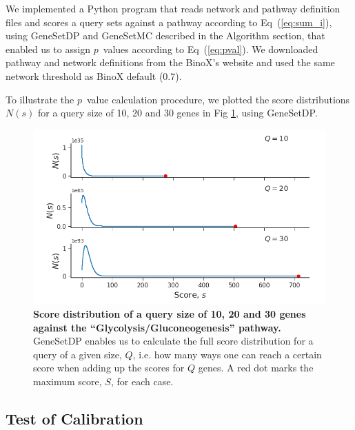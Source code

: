 \documentclass[10pt,letterpaper]{article}
\begin{document}
We implemented a Python program that reads network and pathway definition files and scores a query sets against a pathway according to Eq~(\ref{eq:sum_i}), using GeneSetDP and GeneSetMC described in the Algorithm section, that enabled us to assign $p$~values according to Eq~(\ref{eq:pval}). We downloaded pathway and network definitions from the BinoX's website and used the same network threshold as BinoX default ($0.7$).

To illustrate the $p$~value calculation procedure, we plotted the score distributions $N(s)$ for a query size of 10, 20 and 30 genes in Fig \ref{fig:score_dist}, using GeneSetDP.

\begin{figure}[htb]
	\begin{center}
		\includegraphics[width=.9\textwidth]{figures/score_distribuition_multiple.png}
    \end{center}
  \caption{{\bf Score distribution of a query size of 10, 20 and 30 genes against the ``Glycolysis/Gluconeogenesis'' pathway.} GeneSetDP enables us to calculate the full score distribution for a query of a given size, $Q$, i.e. how many ways one can reach a certain score when adding up the scores for $Q$ genes. A red dot marks the maximum score, $S$, for each case.}
  \label{fig:score_dist}
\end{figure}

\subsection*{Test of Calibration}
\end{document}
